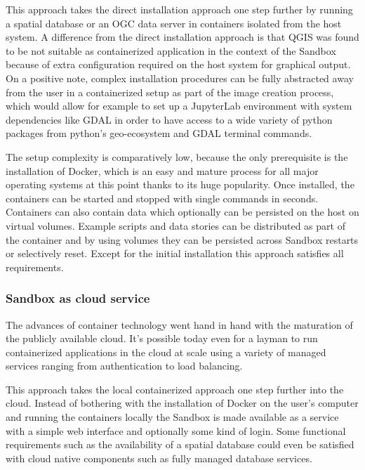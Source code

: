 \documentclass[11pt, a4paper, oneside, parskip=full-]{scrartcl}
\begin{document}
This approach takes the direct installation approach one step further by running
a spatial database or an OGC data server in containers isolated from the host
system. A difference from the direct installation approach is that QGIS was
found to be not suitable as containerized application in the context of the
Sandbox because of extra configuration required on the host system for graphical
output. On a positive note, complex installation procedures can be fully
abstracted away from the user in a containerized setup as part of the image
creation process, which would allow for example to set up a JupyterLab
environment with system dependencies like GDAL in order to have access to a wide
variety of python packages from python's geo-ecosystem and GDAL terminal
commands.

The setup complexity is comparatively low, because the only prerequisite is the
installation of Docker, which is an easy and mature process for all major
operating systems at this point thanks to its huge popularity. Once installed,
the containers can be started and stopped with single commands in seconds.
Containers can also contain data which optionally can be persisted on the host
on virtual volumes. Example scripts and data stories can be distributed as part
of the container and by using volumes they can be persisted across Sandbox
restarts or selectively reset. Except for the initial installation this approach
satisfies all requirements.

\subsubsection*{Sandbox as cloud service}
The advances of container technology went hand in hand with the maturation of
the publicly available cloud. It's possible today even for a layman to run
containerized applications in the cloud at scale using a variety of managed
services ranging from authentication to load balancing.

This approach takes the local containerized approach one step further into the
cloud. Instead of bothering with the installation of Docker on the user's
computer and running the containers locally the Sandbox is made available as a
service with a simple web interface and optionally some kind of login. Some
functional requirements such as the availability of a spatial database could
even be satisfied with cloud native components such as fully managed database
services.
\end{document}
